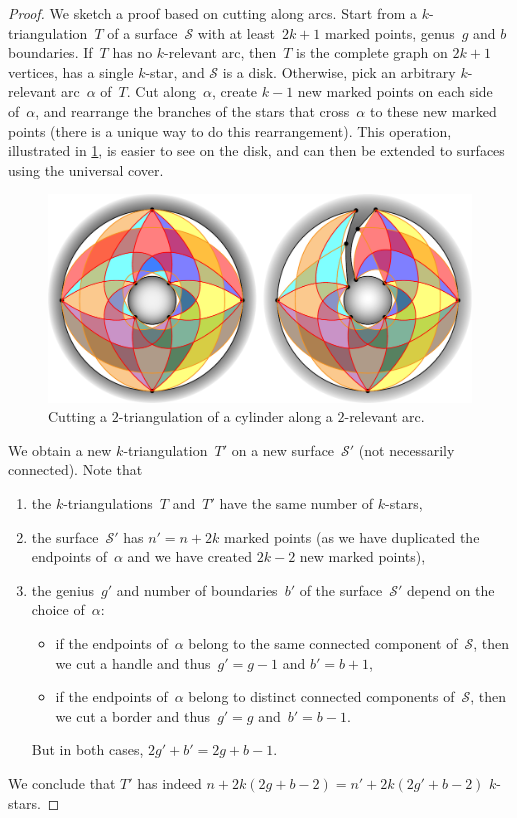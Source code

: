 \documentclass{amsart}
\theoremstyle{remark}
\newcommand{\surface}{\mathcal{S}}
\begin{document}
\begin{proof}
%
We sketch a proof based on cutting along arcs.
Start from a $k$-triangulation~$T$ of a surface~$\surface$ with at least~$2k+1$ marked points, genus~$g$ and $b$ boundaries.
If~$T$ has no $k$-relevant arc, then~$T$ is the complete graph on $2k+1$ vertices, has a single $k$-star, and $\surface$ is a disk.
Otherwise, pick an arbitrary $k$-relevant arc~$\alpha$ of~$T$.
Cut along~$\alpha$, create $k-1$ new marked points on each side of~$\alpha$, and rearrange the branches of the stars that cross~$\alpha$ to these new marked points (there is a unique way to do this rearrangement).
This operation, illustrated in \cref{fig:cutSurface}, is easier to see on the disk, and can then be extended to surfaces using the universal cover.
%
\begin{figure}[b]
	\capstart
	\centerline{\includegraphics[scale=.5]{2triangCylinderCut}}
	\caption{Cutting a $2$-triangulation of a cylinder along a $2$-relevant arc.}
	\label{fig:cutSurface}
\end{figure}
%
We obtain a new $k$-triangulation~$T'$ on a new surface~$\surface'$ (not necessarily connected).
Note that
\begin{enumerate}
\item the $k$-triangulations~$T$ and~$T'$ have the same number of $k$-stars,
\item the surface~$\surface'$ has $n' = n+2k$ marked points (as we have duplicated the endpoints of~$\alpha$ and we have created $2k-2$ new marked points),
\item the genius~$g'$ and number of boundaries~$b'$ of the surface~$\surface'$ depend on the choice of~$\alpha$:
	\begin{itemize}
	\item if the endpoints of~$\alpha$ belong to the same connected component of~$\surface$, then we cut a handle and thus~$g' = g-1$ and $b' = b+1$,
	\item if the endpoints of~$\alpha$ belong to distinct connected components of~$\surface$, then we cut a border and thus~$g' = g$ and~$b' = b-1$.
	\end{itemize}
	But in both cases, $2g'+b' = 2g+b-1$.
\end{enumerate}
We conclude that $T'$ has indeed $n + 2k(2g + b -2) = n' + 2k(2g' + b - 2)$ $k$-stars.


\end{proof}
\end{document}
